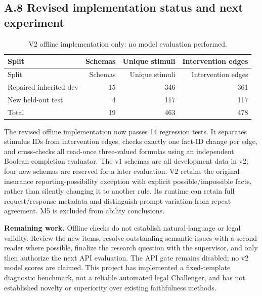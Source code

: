 \documentclass[11pt,a4paper]{article}
\begin{document}
\subsection*{A.8 Revised implementation status and next experiment}

\begingroup\small\setlength{\tabcolsep}{4pt}
\begin{longtable}{lrrr}
\caption{V2 offline implementation only: no model evaluation performed.}\\
\toprule
Split & Schemas & Unique stimuli & Intervention edges \\
\midrule\endfirsthead
\toprule
Split & Schemas & Unique stimuli & Intervention edges \\
\midrule\endhead
\bottomrule\endfoot
Repaired inherited dev & 15 & 346 & 361 \\
New held-out test & 4 & 117 & 117 \\
Total & 19 & 463 & 478 \\
\end{longtable}\endgroup


The revised offline implementation now passes 14 regression tests. It separates stimulus IDs from intervention edges, checks exactly one fact-ID change per edge, and cross-checks all read-once three-valued formulas using an independent Boolean-completion evaluator. The v1 schemas are all development data in v2; four new schemas are reserved for a later evaluation. V2 retains the original insurance reporting-possibility exception with explicit possible/impossible facts, rather than silently changing it to another rule. Its runtime can retain full request/response metadata and distinguish prompt variation from repeat agreement. M5 is excluded from ability conclusions.

\textbf{Remaining work.} Offline checks do not establish natural-language or legal validity. Review the new items, resolve outstanding semantic issues with a second reader where possible, finalize the research question with the supervisor, and only then authorize the next API evaluation. The API gate remains disabled; no v2 model scores are claimed. This project has implemented a fixed-template diagnostic benchmark, not a reliable automated legal Challenger, and has not established novelty or superiority over existing faithfulness methods.
\end{document}
